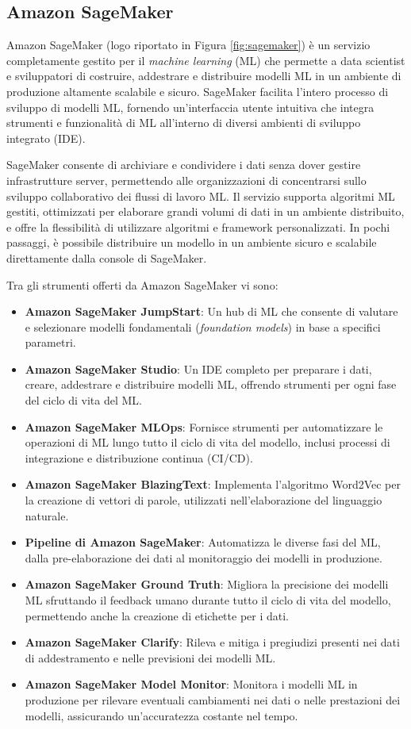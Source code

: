\subsection{Amazon SageMaker}
Amazon SageMaker (logo riportato in Figura \ref{fig:sagemaker}) è un servizio completamente gestito per il \textit{machine learning} (ML) che permette a data scientist e sviluppatori di costruire, addestrare e distribuire modelli ML in un ambiente di produzione altamente scalabile e sicuro. SageMaker facilita l'intero processo di sviluppo di modelli ML, fornendo un'interfaccia utente intuitiva che integra strumenti e funzionalità di ML all'interno di diversi ambienti di sviluppo integrato (IDE).

SageMaker consente di archiviare e condividere i dati senza dover gestire infrastrutture server, permettendo alle organizzazioni di concentrarsi sullo sviluppo collaborativo dei flussi di lavoro ML. Il servizio supporta algoritmi ML gestiti, ottimizzati per elaborare grandi volumi di dati in un ambiente distribuito, e offre la flessibilità di utilizzare algoritmi e framework personalizzati. In pochi passaggi, è possibile distribuire un modello in un ambiente sicuro e scalabile direttamente dalla console di SageMaker.

Tra gli strumenti offerti da Amazon SageMaker vi sono:

\begin{itemize}
    \item \textbf{Amazon SageMaker JumpStart}: Un hub di ML che consente di valutare e selezionare modelli fondamentali (\textit{foundation models}) in base a specifici parametri.
    \item \textbf{Amazon SageMaker Studio}: Un IDE completo per preparare i dati, creare, addestrare e distribuire modelli ML, offrendo strumenti per ogni fase del ciclo di vita del ML.
    \item \textbf{Amazon SageMaker MLOps}: Fornisce strumenti per automatizzare le operazioni di ML lungo tutto il ciclo di vita del modello, inclusi processi di integrazione e distribuzione continua (CI/CD).
    \item \textbf{Amazon SageMaker BlazingText}: Implementa l'algoritmo Word2Vec per la creazione di vettori di parole, utilizzati nell'elaborazione del linguaggio naturale.
    \item \textbf{Pipeline di Amazon SageMaker}: Automatizza le diverse fasi del ML, dalla pre-elaborazione dei dati al monitoraggio dei modelli in produzione.
    \item \textbf{Amazon SageMaker Ground Truth}: Migliora la precisione dei modelli ML sfruttando il feedback umano durante tutto il ciclo di vita del modello, permettendo anche la creazione di etichette per i dati.
    \item \textbf{Amazon SageMaker Clarify}: Rileva e mitiga i pregiudizi presenti nei dati di addestramento e nelle previsioni dei modelli ML.
    \item \textbf{Amazon SageMaker Model Monitor}: Monitora i modelli ML in produzione per rilevare eventuali cambiamenti nei dati o nelle prestazioni dei modelli, assicurando un'accuratezza costante nel tempo.
\end{itemize}

